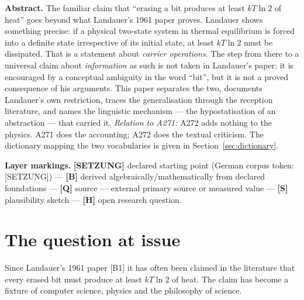 
\providecommand{\qedsq}{\raisebox{0.03em}{\framebox[0.62em]{\rule{0pt}{0.42em}}}}
\begingroup\small\noindent
\textbf{Abstract.} The familiar claim that “erasing a bit produces at least
$kT\ln 2$ of heat” goes beyond what Landauer's 1961 paper proves. Landauer shows
something precise: if a physical two-state system in thermal equilibrium is forced
into a definite state irrespective of its initial state, at least $kT\ln 2$ must
be dissipated. That is a statement about \emph{carrier operations}. The step from
there to a universal claim about \emph{information} as such is not taken in
Landauer's paper; it is encouraged by a conceptual ambiguity in the word “bit”,
but it is not a proved consequence of his arguments. This paper separates the two,
documents Landauer's own restriction, traces the generalisation through the
reception literature, and names the linguistic mechanism --- the hypostatisation
of an abstraction --- that carried it. \emph{Relation to A271:} A272 adds nothing
to the physics. A271 does the accounting; A272 does the textual criticism. The
dictionary mapping the two vocabularies is given in
Section~\ref{sec:dictionary}.
\par\endgroup

\bigskip

\begingroup\small\noindent
\textbf{Layer markings.} \textbf{[SETZUNG]} declared starting point (German corpus token:
[SETZUNG]) --- \textbf{[B]} derived algebraically/mathematically from declared foundations
--- \textbf{[Q]} source --- external primary source or measured value --- \textbf{[S]}
plausibility sketch --- \textbf{[H]} open research question.

\par\endgroup

\bigskip

\section{The question at issue}

Since Landauer's 1961 paper [B1] it has often been claimed in the literature that
every erased bit must produce at least $kT\ln 2$ of heat. The claim has become a
fixture of computer science, physics and the philosophy of science.

